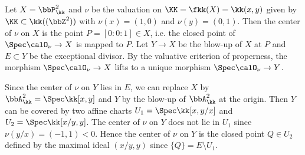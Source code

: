 %

\begin{example}
	Let $X = \bbP^2_\kk$ and $\nu$ be the valuation on $\KK = \fkk(X) = \kk(x,y)$ given by $\KK \subset \kk((\bbZ^2))$ with $\nu(x) = (1,0)$ and $\nu(y) = (0,1)$.
	Then the center of $\nu$ on $X$ is the point $P = [0:0:1] \in X$, i.e. the closed point of $\Spec \calO_\nu \to X$ is mapped to $P$.
	Let $Y \to X$ be the blow-up of $X$ at $P$ and $E \subset Y$ be the exceptional divisor.
	By the valuative criterion of properness, the morphism $\Spec \calO_\nu \to X$ lifts to a unique morphism $\Spec \calO_\nu \to Y$.

	Since the center of $\nu$ on $Y$ lies in $E$, we can replace $X$ by $\bbA^2_\kk = \Spec \kk[x,y]$ and $Y$ by the blow-up of $\bbA^2_\kk$ at the origin.
	Then $Y$ can be covered by two affine charts $U_1 = \Spec \kk[x,y/x]$ and $U_2 = \Spec \kk[x/y,y]$.
	The center of $\nu$ on $Y$ does not lie in $U_1$ since $\nu(y/x) = (-1,1) < 0$.
	Hence the center of $\nu$ on $Y$ is the closed point $Q \in U_2$ defined by the maximal ideal $(x/y,y)$ since $\{Q\} = E \setminus U_1$.
\end{example}


